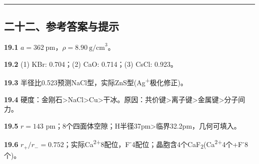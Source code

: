\begin{center}\rule{0.5\linewidth}{0.5pt}\end{center}

\subsection{二十二、参考答案与提示}\label{ux4e8cux5341ux4e8cux53c2ux8003ux7b54ux6848ux4e0eux63d0ux793a}

\textbf{19.1} \(a = 362\ \mathrm{pm}\)，\(\rho = 8.90\ \mathrm{g/cm}^3\)。

\textbf{19.2} (1) KBr: 0.704；(2) CaO: 0.714；(3) CsCl: 0.923。

\textbf{19.3} 半径比0.523预测NaCl型，实际ZnS型(Ag\textsuperscript{+}极化修正)。

\textbf{19.4} 硬度：金刚石\textgreater NaCl\textgreater Cu\textgreater 干冰。原因：共价键\textgreater 离子键\textgreater 金属键\textgreater 分子间力。

\textbf{19.5} \(r=143\) pm；8个四面体空隙；H半径37pm\textgreater 临界32.2pm，几何可填入。

\textbf{19.6} \(r_+/r_-=0.752\)；实际Ca\textsuperscript{2+}8配位，F\textsuperscript{-}4配位；晶胞含4个CaF\textsubscript{2}(Ca\textsuperscript{2+}4个+F\textsuperscript{-}8个)。

